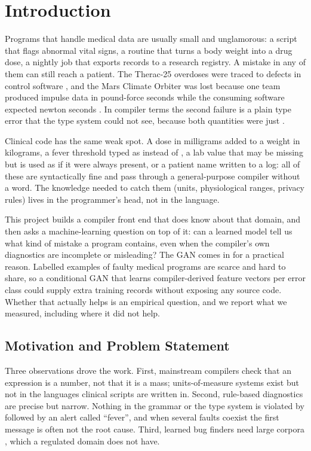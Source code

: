 \section{Introduction}

Programs that handle medical data are usually small and unglamorous: a script that flags abnormal vital signs, a
routine that turns a body weight into a drug dose, a nightly job that exports records to a research registry. A
mistake in any of them can still reach a patient. The Therac-25 overdoses were traced to defects in control
software \cite{leveson1993}, and the Mars Climate Orbiter was lost because one team produced impulse data in
pound-force seconds while the consuming software expected newton seconds \cite{mco1999}. In compiler terms the second
failure is a plain type error that the type system could not see, because both quantities were just .

Clinical code has the same weak spot. A dose in milligrams added to a weight in kilograms, a fever threshold typed as
 instead of , a lab value that may be missing but is used as if it were always present, or a
patient name written to a log: all of these are syntactically fine and pass through a general-purpose compiler without
a word. The knowledge needed to catch them (units, physiological ranges, privacy rules) lives in the programmer's
head, not in the language.

This project builds a compiler front end that does know about that domain, and then asks a machine-learning question
on top of it: can a learned model tell us what kind of mistake a program contains, even when the compiler's own
diagnostics are incomplete or misleading? The GAN comes in for a practical reason. Labelled examples of faulty
medical programs are scarce and hard to share, so a conditional GAN that learns compiler-derived feature vectors per
error class could supply extra training records without exposing any source code. Whether that actually helps is an
empirical question, and we report what we measured, including where it did not help.

\subsection{Motivation and Problem Statement}

Three observations drove the work. First, mainstream compilers check that an expression is a number, not that it is
a mass; units-of-measure systems exist \cite{kennedy1994} but not in the languages clinical scripts are written in.
Second, rule-based diagnostics are precise but narrow. Nothing in the grammar or the type system is violated by
 followed by an alert called ``fever'', and when several faults coexist the first message
is often not the root cause. Third, learned bug finders need large corpora \cite{allamanis2018,pradel2018}, which a
regulated domain does not have.


